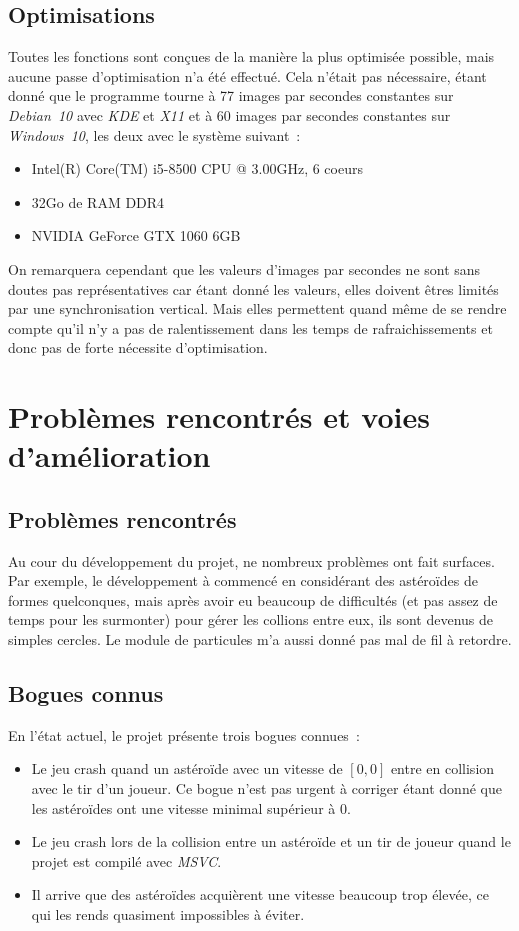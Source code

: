 \documentclass[10pt, french, a4paper]{report}
\begin{document}
\section{Optimisations}

Toutes les fonctions sont conçues de la manière la plus optimisée possible, mais
aucune passe d'optimisation n'a été effectué. Cela n'était pas nécessaire, étant
donné que le programme tourne à 77 images par secondes constantes sur \textit{Debian~10} 
avec \textit{KDE} et \textit{X11} et à 60 images par secondes constantes sur 
\textit{Windows~10}, les deux avec le système suivant~:
\begin{itemize}
	\item Intel(R) Core(TM) i5-8500 CPU @  3.00GHz, 6 coeurs
	\item 32Go de RAM DDR4
	\item NVIDIA GeForce GTX 1060 6GB
\end{itemize}
On remarquera cependant que les valeurs d'images par secondes ne sont sans doutes pas représentatives car étant donné les valeurs, elles doivent êtres limités par une 
synchronisation vertical. Mais elles permettent quand même de se rendre compte qu'il
n'y a pas de ralentissement dans les temps de rafraichissements et donc pas de forte
nécessite d'optimisation.

\chapter{Problèmes rencontrés et voies d'amélioration}

\section{Problèmes rencontrés}

Au cour du développement du projet, ne nombreux problèmes ont fait surfaces. 
Par exemple, le développement à commencé en considérant des astéroïdes de 
formes quelconques, mais après avoir eu beaucoup de difficultés (et pas assez de 
temps pour les surmonter) pour gérer les collions entre eux, ils sont devenus de 
simples cercles.
Le module de particules m'a aussi donné pas mal de fil à retordre.

\section{Bogues connus}

En l'état actuel, le projet présente trois bogues connues~:
\begin{itemize}
	\item Le jeu \og crash \fg{} quand un astéroïde avec un vitesse de $[0, 0]$ entre en 
	      collision avec le tir d'un joueur. Ce bogue n'est pas urgent à corriger
	      étant donné que les astéroïdes ont une vitesse minimal supérieur à $0$.
	\item Le jeu \og crash \fg{} lors de la collision entre un astéroïde et un tir de
	      joueur quand le projet est compilé avec \textit{MSVC}.
	\item Il arrive que des astéroïdes acquièrent une vitesse beaucoup trop élevée, ce
	      qui les rends quasiment impossibles à éviter.
\end{itemize}
\end{document}
